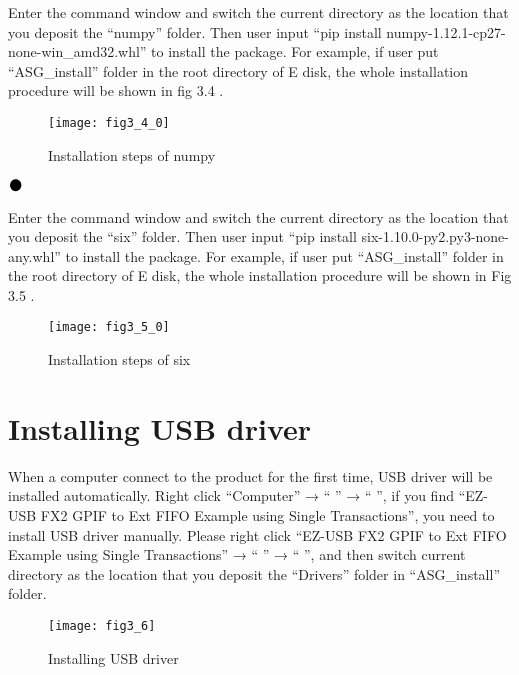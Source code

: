 Enter the command window and switch the current directory as the location that you deposit the “numpy” folder. Then user input “pip install numpy-1.12.1-cp27-none-win\_amd32.whl” to install the package. For example, if user put “ASG\_install” folder in the root directory of E disk, the whole installation procedure will be shown in fig 3.4 . 
\begin{figure}[H]
\centering
\texttt{[image: fig3\_4\_0]}
\caption{Installation steps of numpy}
\end{figure}

\newpage
\noindent$\vcenter{\hbox{\huge$\bullet$}}$\quad\fontsize{12pt}{\baselineskip}\textbf{}

Enter the command window and switch the current directory as the location that you deposit the “six” folder. Then user input “pip install six-1.10.0-py2.py3-none-any.whl” to install the package. For example, if user put “ASG\_install” folder in the root directory of E disk, the whole installation procedure will be shown in Fig 3.5 .
\begin{figure}[H]
\centering
\texttt{[image: fig3\_5\_0]}
\caption{Installation steps of six}
\end{figure}

\vspace{0.8cm}
\section{\heiti Installing USB driver}

When a computer connect to the product for the first time, USB driver will be installed automatically. Right click “Computer” → “ ” → “ ”, if you find “EZ-USB FX2 GPIF to Ext FIFO Example using Single Transactions”, you need to install USB driver manually. Please right click “EZ-USB FX2 GPIF to Ext FIFO Example using Single Transactions” → “ ” → “ ”, and then switch current directory as the location that you deposit the “Drivers” folder in “ASG\_install” folder.    
\begin{figure}[htbp]
\centering
\texttt{[image: fig3\_6]}
\caption{Installing USB driver}
\end{figure}

